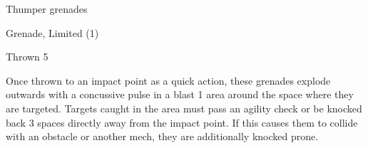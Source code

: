 Thumper grenades
 
Grenade, Limited (1)
 
Thrown 5
 
Once thrown to an impact point as a quick action, these grenades explode outwards with a  
concussive pulse in a blast 1 area around the space where they are targeted. Targets caught in  
the area must pass an agility check or be knocked back 3 spaces directly away from the impact  
point. If this causes them to collide with an obstacle or another mech, they are additionally  
knocked prone.
 
